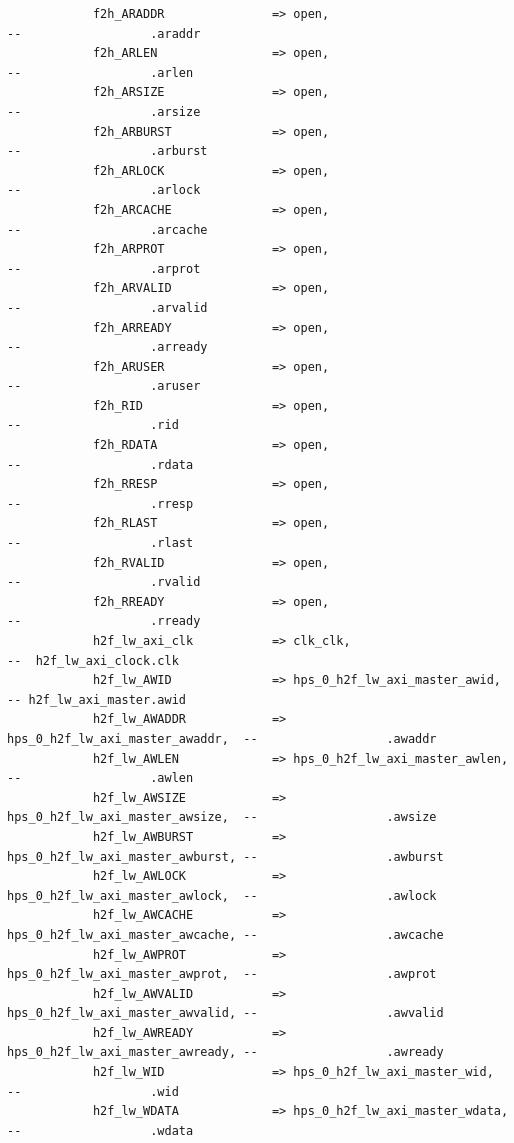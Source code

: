 \documentclass[conference]{IEEEtran}
\begin{document}
\begin{lstlisting}
			f2h_ARADDR               => open,                            --                  .araddr
			f2h_ARLEN                => open,                            --                  .arlen
			f2h_ARSIZE               => open,                            --                  .arsize
			f2h_ARBURST              => open,                            --                  .arburst
			f2h_ARLOCK               => open,                            --                  .arlock
			f2h_ARCACHE              => open,                            --                  .arcache
			f2h_ARPROT               => open,                            --                  .arprot
			f2h_ARVALID              => open,                            --                  .arvalid
			f2h_ARREADY              => open,                            --                  .arready
			f2h_ARUSER               => open,                            --                  .aruser
			f2h_RID                  => open,                            --                  .rid
			f2h_RDATA                => open,                            --                  .rdata
			f2h_RRESP                => open,                            --                  .rresp
			f2h_RLAST                => open,                            --                  .rlast
			f2h_RVALID               => open,                            --                  .rvalid
			f2h_RREADY               => open,                            --                  .rready
			h2f_lw_axi_clk           => clk_clk,                         --  h2f_lw_axi_clock.clk
			h2f_lw_AWID              => hps_0_h2f_lw_axi_master_awid,    -- h2f_lw_axi_master.awid
			h2f_lw_AWADDR            => hps_0_h2f_lw_axi_master_awaddr,  --                  .awaddr
			h2f_lw_AWLEN             => hps_0_h2f_lw_axi_master_awlen,   --                  .awlen
			h2f_lw_AWSIZE            => hps_0_h2f_lw_axi_master_awsize,  --                  .awsize
			h2f_lw_AWBURST           => hps_0_h2f_lw_axi_master_awburst, --                  .awburst
			h2f_lw_AWLOCK            => hps_0_h2f_lw_axi_master_awlock,  --                  .awlock
			h2f_lw_AWCACHE           => hps_0_h2f_lw_axi_master_awcache, --                  .awcache
			h2f_lw_AWPROT            => hps_0_h2f_lw_axi_master_awprot,  --                  .awprot
			h2f_lw_AWVALID           => hps_0_h2f_lw_axi_master_awvalid, --                  .awvalid
			h2f_lw_AWREADY           => hps_0_h2f_lw_axi_master_awready, --                  .awready
			h2f_lw_WID               => hps_0_h2f_lw_axi_master_wid,     --                  .wid
			h2f_lw_WDATA             => hps_0_h2f_lw_axi_master_wdata,   --                  .wdata

\end{lstlisting}
\end{document}
